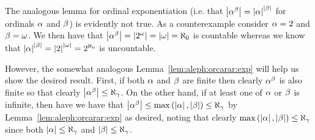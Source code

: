 {{    The analogous lemma for ordinal exponentiation (i.e. that $\left| \alpha^\beta \right| = \left| \alpha \right|^{\left| \beta \right|}$ for ordinals $\alpha$ and $\beta$) is evidently not true.
    As a counterexample consider $\alpha = 2$ and $\beta = \omega$.
    We then have that $\left| \alpha^\beta \right| = \left| 2^\omega \right| = \left| \omega \right| = \aleph_0$ is countable whereas we know that $\left| \alpha \right|^{\left| \beta \right|} = \left| 2 \right|^{\left| \omega \right|} = 2^{\aleph_0}$ is uncountable.

    However, the somewhat analogous Lemma~\ref{lem:aleph:orcarar:exp} will help us show the desired result.
    First, if both $\alpha$ and $\beta$ are finite then clearly $\alpha^\beta$ is also finite so that clearly $\left| \alpha^\beta \right| \leq \aleph_\gamma$.
    On the other hand, if at least one of $\alpha$ or $\beta$ is infinite, then have we have that $\left| \alpha^\beta \right| \leq \max\left( \left| \alpha \right|, \left| \beta \right| \right) \leq \aleph_\gamma$ by Lemma~\ref{lem:aleph:orcarar:exp} as desired, noting that clearly $\max\left( \left| \alpha \right|, \left| \beta \right| \right) \leq \aleph_\gamma$ since both $\left| \alpha \right| \leq \aleph_\gamma$ and $\left| \beta \right| \leq \aleph_\gamma$.
  }
}


